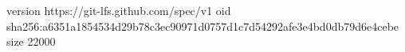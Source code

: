 version https://git-lfs.github.com/spec/v1
oid sha256:a6351a1854534d29b78c3ec90971d0757d1c7d54292afe3e4bd0db79d6e4cebe
size 22000
